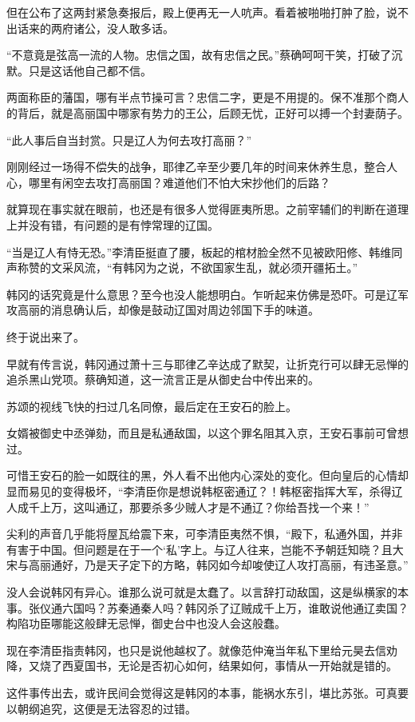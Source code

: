但在公布了这两封紧急奏报后，殿上便再无一人吭声。看着被啪啪打肿了脸，说不出话来的两府诸公，没人敢多话。

“不意竟是弦高一流的人物。忠信之国，故有忠信之民。”蔡确呵呵干笑，打破了沉默。只是这话他自己都不信。

两面称臣的藩国，哪有半点节操可言？忠信二字，更是不用提的。保不准那个商人的背后，就是高丽国中哪家有势力的王公，后顾无忧，正好可以搏一个封妻荫子。

“此人事后自当封赏。只是辽人为何去攻打高丽？”

刚刚经过一场得不偿失的战争，耶律乙辛至少要几年的时间来休养生息，整合人心，哪里有闲空去攻打高丽国？难道他们不怕大宋抄他们的后路？

就算现在事实就在眼前，也还是有很多人觉得匪夷所思。之前宰辅们的判断在道理上并没有错，有问题的是有悖常理的辽国。

“当是辽人有恃无恐。”李清臣挺直了腰，板起的棺材脸全然不见被欧阳修、韩维同声称赞的文采风流，“有韩冈为之说，不欲国家生乱，就必须开疆拓土。”

韩冈的话究竟是什么意思？至今也没人能想明白。乍听起来仿佛是恐吓。可是辽军攻高丽的消息确认后，却像是鼓动辽国对周边邻国下手的味道。

终于说出来了。

早就有传言说，韩冈通过萧十三与耶律乙辛达成了默契，让折克行可以肆无忌惮的追杀黑山党项。蔡确知道，这一流言正是从御史台中传出来的。

苏颂的视线飞快的扫过几名同僚，最后定在王安石的脸上。

女婿被御史中丞弹劾，而且是私通敌国，以这个罪名阻其入京，王安石事前可曾想过。

可惜王安石的脸一如既往的黑，外人看不出他内心深处的变化。但向皇后的心情却显而易见的变得极坏，“李清臣你是想说韩枢密通辽？！韩枢密指挥大军，杀得辽人成千上万，这叫通辽，那要杀多少贼人才是不通辽？你给吾找一个来！”

尖利的声音几乎能将屋瓦给震下来，可李清臣夷然不惧，“殿下，私通外国，并非有害于中国。但问题是在于一个‘私’字上。与辽人往来，岂能不予朝廷知晓？且大宋与高丽通好，乃是天子定下的方略，韩冈如今却唆使辽人攻打高丽，有违圣意。”

没人会说韩冈有异心。谁那么说可就是太蠢了。以言辞打动敌国，这是纵横家的本事。张仪通六国吗？苏秦通秦人吗？韩冈杀了辽贼成千上万，谁敢说他通辽卖国？构陷功臣哪能这般肆无忌惮，御史台中也没人会这般蠢。

现在李清臣指责韩冈，也只是说他越权了。就像范仲淹当年私下里给元昊去信劝降，又烧了西夏国书，无论是否初心如何，结果如何，事情从一开始就是错的。

这件事传出去，或许民间会觉得这是韩冈的本事，能祸水东引，堪比苏张。可真要以朝纲追究，这便是无法容忍的过错。

